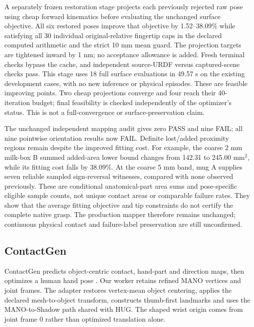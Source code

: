 \documentclass[10pt,letterpaper]{article}
\begin{document}
A separately frozen restoration stage projects each previously rejected raw
pose using cheap forward kinematics before evaluating the unchanged surface
objective. All six restored poses improve that objective by 1.52--38.09\% while
satisfying all 30 individual original-relative fingertip caps in the declared
computed arithmetic and the strict 10 mm mean guard. The projection targets
are tightened inward by 1 nm; no acceptance allowance is added. Fresh terminal
checks bypass the cache, and independent source-URDF versus captured-scene
checks pass. This stage uses 18 full surface evaluations in 49.57 s on the
existing development cases, with no new inference or physical episodes. These
are feasible improving points. Two cheap projections converge and four reach
their 40-iteration budget; final feasibility is checked independently of the
optimizer's status. This is not a full-convergence or surface-preservation claim.

The unchanged independent mapping audit gives zero PASS and nine FAIL; all
nine pointwise orientation results now FAIL. Definite lost/added proximity
regions remain despite the improved fitting cost. For example, the coarse
2 mm milk-box B summed added-area lower bound changes from 142.31 to
245.00 mm$^2$, while its fitting cost falls by 38.09\%. At the coarse 5 mm
band, mug A supplies seven reliable sampled sign-reversal witnesses, compared
with none observed previously. These are conditional anatomical-part area
sums and pose-specific eligible sample counts, not unique contact areas or
comparable failure rates. They show that the average fitting objective and
tip constraints do not certify the complete native grasp. The production
mapper therefore remains unchanged; continuous physical contact and
failure-label preservation are still unconfirmed.

\subsection{ContactGen}
ContactGen predicts object-centric contact, hand-part and direction maps,
then optimizes a human hand pose \cite{contactgen}. Our worker retains refined
MANO vertices and joint frames. The adapter restores vertex-mean object
centering, applies the declared mesh-to-object transform, constructs thumb-first
landmarks and uses the MANO-to-Shadow path shared with HUG. The shaped wrist
origin comes from joint frame 0 rather than optimized translation alone.
\end{document}
